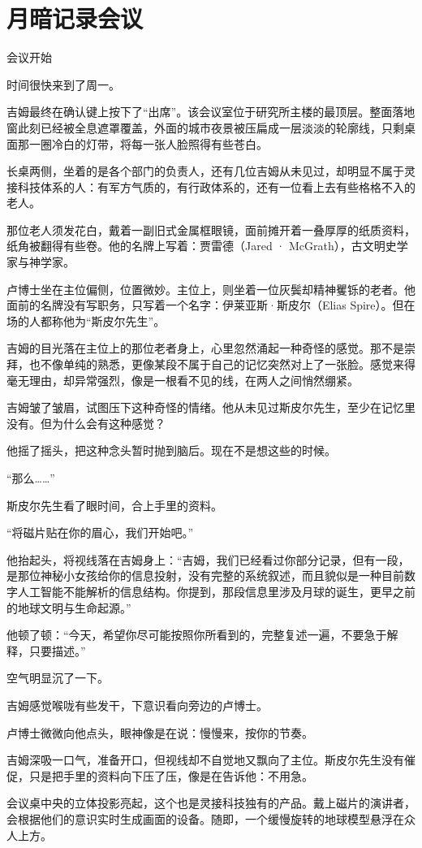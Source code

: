\chapter{月暗记录会议}

会议开始

时间很快来到了周一。

吉姆最终在确认键上按下了“出席”。该会议室位于研究所主楼的最顶层。整面落地窗此刻已经被全息遮罩覆盖，外面的城市夜景被压扁成一层淡淡的轮廓线，只剩桌面那一圈冷白的灯带，将每一张人脸照得有些苍白。

长桌两侧，坐着的是各个部门的负责人，还有几位吉姆从未见过，却明显不属于灵接科技体系的人：有军方气质的，有行政体系的，还有一位看上去有些格格不入的老人。

那位老人须发花白，戴着一副旧式金属框眼镜，面前摊开着一叠厚厚的纸质资料，纸角被翻得有些卷。他的名牌上写着：贾雷德（Jared · McGrath），古文明史学家与神学家。

卢博士坐在主位偏侧，位置微妙。主位上，则坐着一位灰鬓却精神矍铄的老者。他面前的名牌没有写职务，只写着一个名字：伊莱亚斯·斯皮尔（Elias Spire）。但在场的人都称他为“斯皮尔先生”。

吉姆的目光落在主位上的那位老者身上，心里忽然涌起一种奇怪的感觉。那不是崇拜，也不像单纯的熟悉，更像某段不属于自己的记忆突然对上了一张脸。感觉来得毫无理由，却异常强烈，像是一根看不见的线，在两人之间悄然绷紧。

吉姆皱了皱眉，试图压下这种奇怪的情绪。他从未见过斯皮尔先生，至少在记忆里没有。但为什么会有这种感觉？

他摇了摇头，把这种念头暂时抛到脑后。现在不是想这些的时候。

“那么……”

斯皮尔先生看了眼时间，合上手里的资料。

“将磁片贴在你的眉心，我们开始吧。”

他抬起头，将视线落在吉姆身上：“吉姆，我们已经看过你部分记录，但有一段，是那位神秘小女孩给你的信息投射，没有完整的系统叙述，而且貌似是一种目前数字人工智能不能解析的信息结构。你提到，那段信息里涉及月球的诞生，更早之前的地球文明与生命起源。”

他顿了顿：“今天，希望你尽可能按照你所看到的，完整复述一遍，不要急于解释，只要描述。”

空气明显沉了一下。

吉姆感觉喉咙有些发干，下意识看向旁边的卢博士。

卢博士微微向他点头，眼神像是在说：慢慢来，按你的节奏。

吉姆深吸一口气，准备开口，但视线却不自觉地又飘向了主位。斯皮尔先生没有催促，只是把手里的资料向下压了压，像是在告诉他：不用急。

会议桌中央的立体投影亮起，这个也是灵接科技独有的产品。戴上磁片的演讲者，会根据他们的意识实时生成画面的设备。随即，一个缓慢旋转的地球模型悬浮在众人上方。
